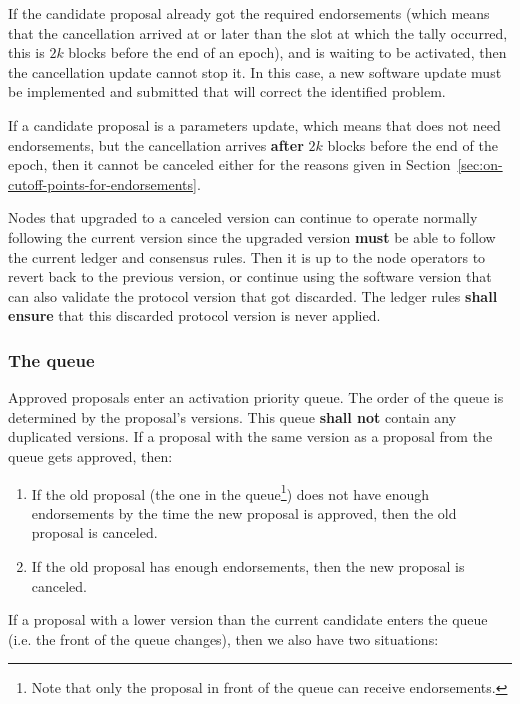 If the candidate proposal already got the required endorsements (which means
that the cancellation arrived at or later than the slot at which the tally
occurred, this is $2k$ blocks before the end of an epoch), and is waiting to
be activated, then the cancellation update cannot stop it. In this case, a new
software update must be implemented and submitted that will correct the
identified problem.

If a candidate proposal is a parameters update, which means that does not need
endorsements, but the cancellation arrives \textbf{after} $2k$ blocks before
the end of the epoch, then it cannot be canceled either for the reasons given in
Section~\ref{sec:on-cutoff-points-for-endorsements}.

Nodes that upgraded to a canceled version can continue to operate normally
following the current version since the upgraded version \textbf{must} be able
to follow the current ledger and consensus rules.
%
Then it is up to the node operators to revert back to the previous version, or
continue using the software version that can also validate the protocol version
that got discarded. The ledger rules \textbf{shall ensure} that this discarded
protocol version is never applied.

\subsubsection{The queue}
\label{sec:the-queue}

Approved proposals enter an activation priority queue. The order of the queue is
determined by the proposal's versions. This queue \textbf{shall not} contain any
duplicated versions. If a proposal with the same version as a proposal from the
queue gets approved, then:

\begin{enumerate}
\item If the old proposal (the one in the queue\footnote{Note that only the
    proposal in front of the queue can receive endorsements.}) does not have
  enough endorsements by the time the new proposal is approved, then the old
  proposal is canceled.
\item If the old proposal has enough endorsements, then the new proposal is
  canceled.
\end{enumerate}


If a proposal with a lower version than the current candidate enters the queue
(i.e. the front of the queue changes), then we also have two situations:

